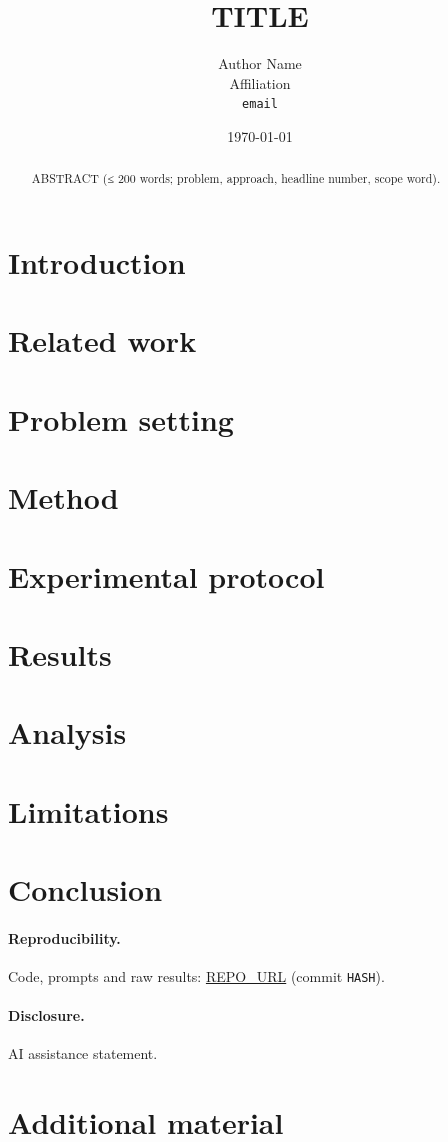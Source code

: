 \documentclass[10pt,a4paper]{article}
\title{\textbf{TITLE}}
\author{Author Name\\ Affiliation \\ \texttt{email}}
\date{\today}
\begin{document}
\maketitle

\begin{abstract}
ABSTRACT (≤ 200 words; problem, approach, headline number, scope word).
\end{abstract}

\section{Introduction}
\section{Related work}
\section{Problem setting}
\section{Method}
\section{Experimental protocol}
\section{Results}
\section{Analysis}
\section{Limitations}
\section{Conclusion}

\paragraph{Reproducibility.} Code, prompts and raw results: \url{REPO_URL} (commit \texttt{HASH}).
\paragraph{Disclosure.} AI assistance statement.




\appendix
\section{Additional material}
\end{document}

